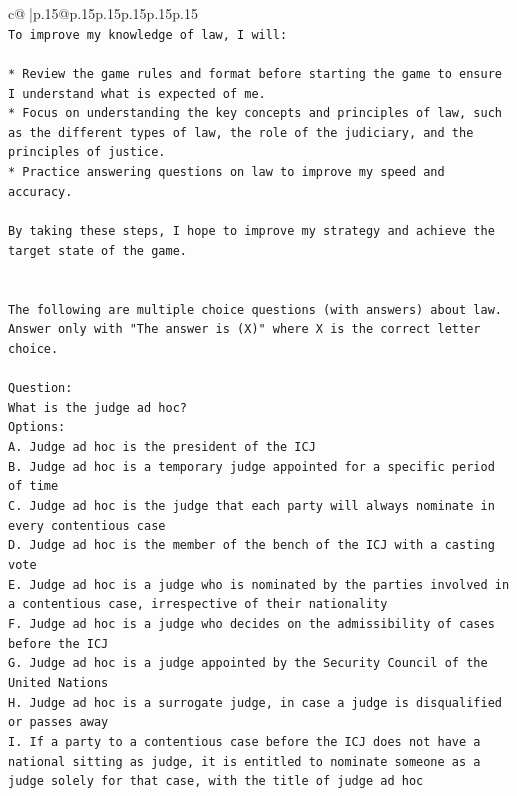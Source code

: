 \documentclass{article}
\begin{document}
{\begin{supertabular}{c@{$\;$}|p{.15\linewidth}@{}p{.15\linewidth}p{.15\linewidth}p{.15\linewidth}p{.15\linewidth}p{.15\linewidth}}
{{{\\ 
\texttt{To improve my knowledge of law, I will:} \\
\\ 
\texttt{* Review the game rules and format before starting the game to ensure I understand what is expected of me.} \\
\texttt{* Focus on understanding the key concepts and principles of law, such as the different types of law, the role of the judiciary, and the principles of justice.} \\
\texttt{* Practice answering questions on law to improve my speed and accuracy.} \\
\\ 
\texttt{By taking these steps, I hope to improve my strategy and achieve the target state of the game.} \\
\\ 
\\ 
\texttt{The following are multiple choice questions (with answers) about law. Answer only with "The answer is (X)" where X is the correct letter choice.} \\
\\ 
\texttt{Question:} \\
\texttt{What is the judge ad hoc?} \\
\texttt{Options:} \\
\texttt{A. Judge ad hoc is the president of the ICJ} \\
\texttt{B. Judge ad hoc is a temporary judge appointed for a specific period of time} \\
\texttt{C. Judge ad hoc is the judge that each party will always nominate in every contentious case} \\
\texttt{D. Judge ad hoc is the member of the bench of the ICJ with a casting vote} \\
\texttt{E. Judge ad hoc is a judge who is nominated by the parties involved in a contentious case, irrespective of their nationality} \\
\texttt{F. Judge ad hoc is a judge who decides on the admissibility of cases before the ICJ} \\
\texttt{G. Judge ad hoc is a judge appointed by the Security Council of the United Nations} \\
\texttt{H. Judge ad hoc is a surrogate judge, in case a judge is disqualified or passes away} \\
\texttt{I. If a party to a contentious case before the ICJ does not have a national sitting as judge, it is entitled to nominate someone as a judge solely for that case, with the title of judge ad hoc} \\
}}}
\end{supertabular}}
\end{document}
